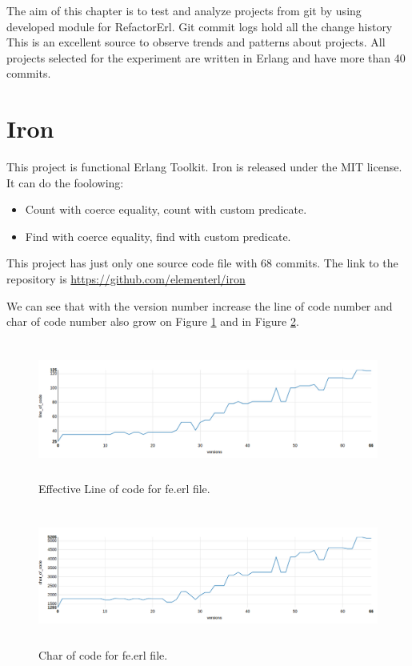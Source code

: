 The aim of this chapter is to test and analyze projects from git by using developed module for RefactorErl. Git commit logs hold all the change history This is an excellent source to observe trends and patterns about projects. All projects selected for the experiment are written in Erlang and have more than 40 commits.

\section{Iron}

This project is functional Erlang Toolkit. Iron is released under the MIT license. It can do the foolowing:
\begin{itemize}
	\item Count with coerce equality, count with custom predicate.
	\item Find with coerce equality, find with custom predicate.
\end{itemize}

This project has just only one source code file with 68 commits. The link to the repository is \url{https://github.com/elementerl/iron}

We can see that with the version number increase the line of code number and char of code number also grow on Figure \ref{fig:loc_iron} and in Figure \ref{fig:char_iron}.

\begin{figure}[h]
	\centering
	\includegraphics[height=45mm]{figures/loc_iron.png}
	\caption{Effective Line of code for fe.erl file.}
	\label{fig:loc_iron}
\end{figure}

\begin{figure}[h]
	\centering
	\includegraphics[height=45mm]{figures/char_iron.png}
	\caption{Char of code for fe.erl file.}
	\label{fig:char_iron}
\end{figure}

